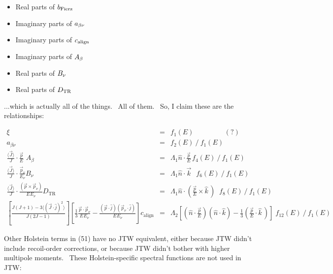 \begin{itemize}
	\item Real parts of $b_{\mathrm{Fierz}}$
	\item Imaginary parts of $a_{\beta\nu}$
	\item Imaginary parts of $c_{\mathrm{align}}$
	\item Imaginary parts of $A_{\beta}$
	\item Real parts of $B_\nu$
	\item Real parts of $D_{\mathrm{TR}}$
\end{itemize}

...which is actually all of the things.  All of them.  So, I claim these are the relationships:

\begin{eqnarray}
\xi          &=& f_1(E) \;\;\;\;\;\; \;\;\;\;\;\; \;\;\;\; (?) \\
a_{\beta\nu} &=& f_2(E) \: / \: f_1(E) \\
\frac{\langle\vec{J}\rangle}{J} \cdot \frac{\vec{p}}{E} \,\, A_\beta 
  &=& \Lambda_1 \hat{n}\cdot \frac{\vec{p}}{E} \, f_4(E) \:/\: f_1(E) \\
\frac{\langle\vec{J}\rangle}{J} \cdot \frac{\vec{p}_\nu}{E_\nu} B_\nu  
  &=& \Lambda_1 \hat{n} \cdot \vec{k} \;\;\, f_6(E) \:/\: f_1(E) \\
\frac{\langle\vec{J}\rangle}{J} \cdot \frac{\left( \vec{p} \times \vec{p}_\nu \right)}{E_{} E_\nu} D_{\mathrm{TR}} 
  &=& \Lambda_1 \hat{n} \cdot ( \frac{\vec{p}}{E} \times \hat{k} \,) \;\; f_8(E) \:/\: f_1(E) \\
\left[ \frac{J(J+1) - 3\langle (\vec{J}\cdot\hat{j})^2 \rangle}{J(2J-1)} \right] \!\!\!
\left[\frac{1}{3} \frac{\vec{p}\cdot\vec{p}_\nu }{E_{} E_\nu} - \frac{ (\vec{p}\cdot\hat{j}) (\vec{p}_\nu \cdot\hat{j} ) }{E_{} E_\nu} \right]c_{\mathrm{align}} 
  &=& \Lambda_2 \! \left[(\hat{n}\cdot\frac{\vec{p}}{E})(\hat{n}\cdot\hat{k})  - \frac{1}{3} (\frac{\vec{p}}{E}\cdot\hat{k} \,)\right] \; f_{12}(E) \:/\: f_1(E)
\end{eqnarray}

Other Holstein terms in (51) have no JTW equivalent, either because JTW didn't include recoil-order corrections, or because JTW didn't bother with higher multipole moments.  These Holstein-specific spectral functions are not used in JTW:

